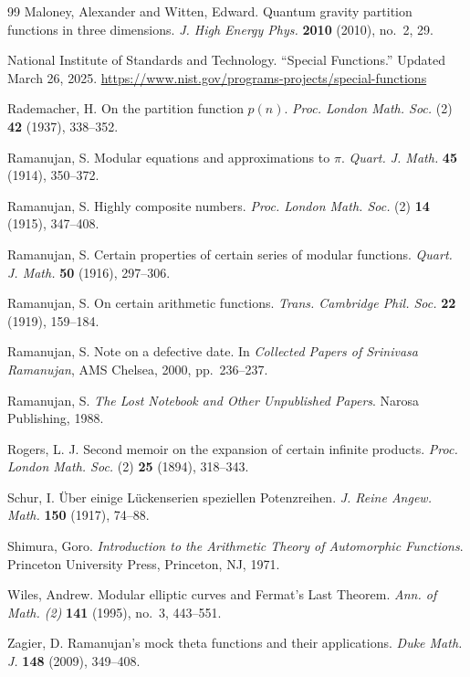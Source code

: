 \documentclass[10pt]{amsart}
\theoremstyle{plain}
\theoremstyle{definition}
\theoremstyle{remark}
\begin{document}
\begin{thebibliography}{99}
Maloney, Alexander and Witten, Edward.
Quantum gravity partition functions in three dimensions.
\textit{J. High Energy Phys.} \textbf{2010} (2010), no.~2, 29.

National Institute of Standards and Technology.
``Special Functions.''
Updated March 26, 2025.
\url{https://www.nist.gov/programs-projects/special-functions}

Rademacher, H.
On the partition function $p(n)$.
\textit{Proc. London Math. Soc.} (2) \textbf{42} (1937), 338--352.

Ramanujan, S.
Modular equations and approximations to $\pi$.
\textit{Quart. J. Math.} \textbf{45} (1914), 350--372.

Ramanujan, S.
Highly composite numbers.
\textit{Proc. London Math. Soc.} (2) \textbf{14} (1915), 347--408.

Ramanujan, S.
Certain properties of certain series of modular functions.
\textit{Quart. J. Math.} \textbf{50} (1916), 297--306.

Ramanujan, S.
On certain arithmetic functions.
\textit{Trans. Cambridge Phil. Soc.} \textbf{22} (1919), 159--184.

Ramanujan, S.
Note on a defective date.
In \textit{Collected Papers of Srinivasa Ramanujan},
AMS Chelsea, 2000, pp.~236--237.

Ramanujan, S.
\textit{The Lost Notebook and Other Unpublished Papers}.
Narosa Publishing, 1988.

Rogers, L. J.
Second memoir on the expansion of certain infinite products.
\textit{Proc. London Math. Soc.} (2) \textbf{25} (1894), 318--343.

Schur, I.
\"Uber einige L\"uckenserien speziellen Potenzreihen.
\textit{J. Reine Angew. Math.} \textbf{150} (1917), 74--88.

Shimura, Goro.
\textit{Introduction to the Arithmetic Theory of Automorphic Functions}.
Princeton University Press, Princeton, NJ, 1971.

Wiles, Andrew.
Modular elliptic curves and Fermat's Last Theorem.
\textit{Ann. of Math. (2)} \textbf{141} (1995), no.~3, 443--551.

Zagier, D.
Ramanujan's mock theta functions and their applications.
\textit{Duke Math. J.} \textbf{148} (2009), 349--408.

\end{thebibliography}

\end{document}
